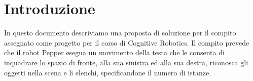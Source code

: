 \section{Introduzione}

In questo documento descriviamo una proposta di soluzione per il compito assegnato come progetto per il corso di Cognitive Robotics. Il compito prevede che il robot Pepper esegua un movimento della testa che le consenta di inquadrare lo spazio di fronte, alla sua sinistra ed alla sua destra, riconosca gli oggetti nella scena e li elenchi, specificandone il numero di istanze.